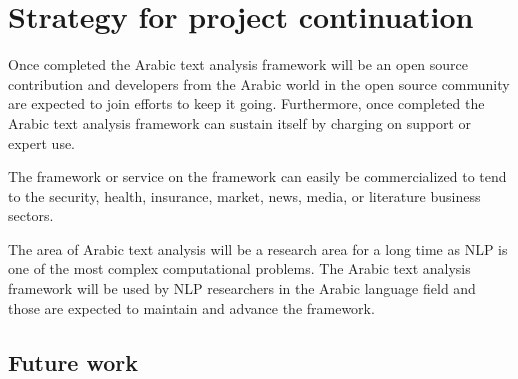 \documentclass[12pt]{article}
\begin{document}
\section{Strategy for project continuation}
\label{s:continue}


Once completed the Arabic text analysis framework will be 
an open source contribution and developers from the Arabic 
world in the open source community are expected to join 
efforts to keep it going.
Furthermore, once completed the Arabic text analysis framework 
can sustain itself by charging on support or expert use.

The framework or service on the framework can easily be 
commercialized to tend to the security, health, insurance, market,
news, media, or literature business sectors.
 
The area of Arabic text analysis will be a research area for 
a long time as NLP is one of the most complex computational 
problems.
The Arabic text analysis framework will be used by NLP 
researchers in the Arabic language field and those are 
expected to maintain and advance the framework.

\subsection{Future work}
\end{document}
